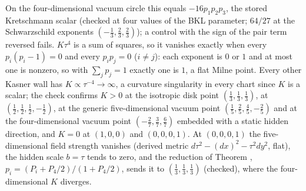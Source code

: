 On the four-dimensional vacuum circle this equals $-16p_{1}p_{2}p_{3}$, the stored Kretschmann scalar (checked at four values of the BKL parameter; $64/27$ at the Schwarzschild exponents $(-\tfrac13, \tfrac23, \tfrac23)$); a control with the sign of the pair term reversed fails. $K\tau^{4}$ is a sum of squares, so it vanishes exactly when every $p_{i}(p_{i} - 1) = 0$ and every $p_{i}p_{j} = 0$ ($i \ne j$): each exponent is $0$ or $1$ and at most one is nonzero, so with $\sum_{j}p_{j} = 1$ exactly one is $1$, a flat Milne point. Every other Kasner wall has $K \propto \tau^{-4} \to \infty$, a curvature singularity in every chart since $K$ is a scalar; the check confirms $K > 0$ at the isotropic disk point $(\tfrac13, \tfrac13, \tfrac13)$, at $(\tfrac12, \tfrac12, \tfrac12, -\tfrac12)$, at the generic five-dimensional vacuum point $(\tfrac15, \tfrac25, \tfrac45, -\tfrac25)$ and at the four-dimensional vacuum point $(-\tfrac27, \tfrac37, \tfrac67)$ embedded with a static hidden direction, and $K = 0$ at $(1, 0, 0)$ and $(0, 0, 0, 1)$. At $(0, 0, 0, 1)$ the five-dimensional field strength vanishes (derived metric $d\tau^{2} - (dx)^{2} - \tau^{2}dy^{2}$, flat), the hidden scale $b = \tau$ tends to zero, and the reduction of Theorem , $p_{i} = (P_{i} + P_{4}/2)/(1 + P_{4}/2)$, sends it to $(\tfrac13, \tfrac13, \tfrac13)$ (checked), where the four-dimensional $K$ diverges.

